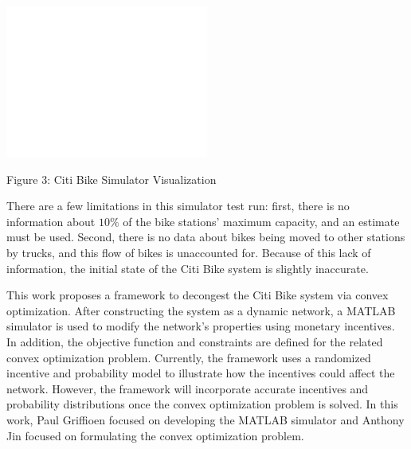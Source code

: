\documentclass[times, 10pt,twocolumn]{article}
\begin{document}
\centerline{\includegraphics[width=0.5\textwidth]{m2/blankfigure.png}}
\centerline{Figure 3: Citi Bike Simulator Visualization}
\hfill \break
\indent There are a few limitations in this simulator test run: first, there is no information about $10\%$ of the bike stations' maximum capacity, and an estimate must be used. Second, there is no data about bikes being moved to other stations by trucks, and this flow of bikes is unaccounted for. Because of this lack of information, the initial state of the Citi Bike system is slightly inaccurate.




This work proposes a framework to decongest the Citi Bike system via convex optimization. After constructing the system as a dynamic network, a MATLAB simulator is used to modify the network's properties using monetary incentives. In addition, the objective function and constraints are defined for the related convex optimization problem. Currently, the framework uses a randomized incentive and probability model to illustrate how the incentives could affect the network. However, the framework will incorporate accurate incentives and probability distributions once the convex optimization problem is solved. In this work, Paul Griffioen focused on developing the MATLAB simulator and Anthony Jin focused on formulating the convex optimization problem.
\end{document}
